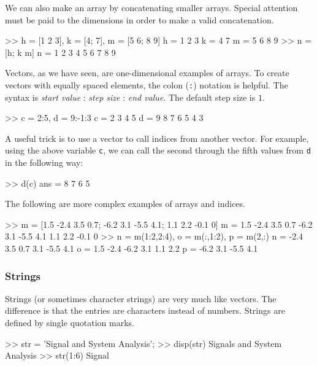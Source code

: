 \par
We can also make an array by concatenating smaller arrays.  Special attention must be paid to the dimensions in order to make a valid concatenation.

\begin{codex}
>> h = [1 2 3], k = [4; 7], m = [5 6; 8 9]
h =
    1   2   3
k =
    4
    7
m =
    5   6
    8   9
>> n = [h; k m]
n =
    1   2   3
    4   5   6
    7   8   9
\end{codex}

\par
Vectors, as we have seen, are one-dimensional examples of arrays.  To create vectors with equally spaced elements, the colon (\verb=:=) notation is helpful. The syntax is \textit{start value} : \textit{step size} : \textit{end value}.  The default step size is $1$.

\begin{codex}
>> c = 2:5, d = 9:-1:3
c =
    2   3   4   5
d =
    9   8   7   6   5   4   3
\end{codex}
A useful trick is to use a vector to call indices from another vector.  For example, using the above variable \verb=c=, we can call the second through the fifth values from \verb=d= in the following way:

\begin{codex}
>> d(c)
ans =
    8   7   6   5
\end{codex}

\par
The following are more complex examples of arrays and indices.

\begin{codex}
>> m = [1.5 -2.4 3.5 0.7; -6.2 3.1 -5.5 4.1; 1.1 2.2 -0.1 0]
m =
    1.5     -2.4    3.5     0.7
    -6.2    3.1     -5.5    4.1
    1.1     2.2     -0.1    0
>> n = m(1:2,2:4), o = m(:,1:2), p = m(2,:)
n =
    -2.4    3.5     0.7
    3.1     -5.5    4.1
o =
    1.5     -2.4
    -6.2    3.1
    1.1     2.2
p =
    -6.2    3.1     -5.5    4.1
\end{codex}

\subsubsection{Strings} \label{sec.matlab.string}
Strings (or sometimes character strings) are very much like vectors.  The difference is that the entries are characters instead of numbers.  Strings are defined by single quotation marks.

\begin{codex}
>> str = 'Signal and System Analysis';
>> disp(str)
Signals and System Analysis
>> str(1:6)
Signal
\end{codex}

